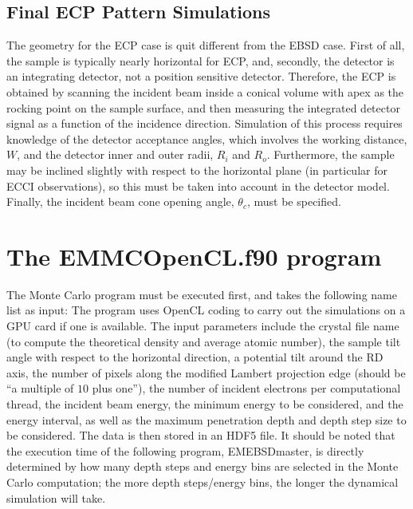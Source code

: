 \documentclass[DIV=calc, paper=letter, fontsize=11pt]{scrartcl}	 %
\begin{document}
\subsection{Final ECP Pattern Simulations \label{sec:ECP}}
The geometry for the ECP case is quit different from the EBSD case.  First of all, the sample is typically nearly horizontal for ECP,
and, secondly, the detector is an integrating detector, not a position sensitive detector.  Therefore, the ECP is obtained by scanning
the incident beam inside a conical volume with apex as the rocking point on the sample surface, and then measuring the integrated 
detector signal as a function of the incidence direction.  Simulation of this process requires knowledge of the detector acceptance 
angles, which involves the working distance, $W$, and the detector inner and outer radii, $R_i$ and $R_o$.  Furthermore, the sample may be inclined
slightly with respect to the horizontal plane (in particular for ECCI observations), so this must be taken into account in the detector model.
Finally, the incident beam cone opening angle, $\theta_c$, must be specified.  %






\section{The \protect\textsf{EMMCOpenCL.f90} program\label{sec:f90MC}}
The Monte Carlo program must be executed first, and takes the following name list as input:
The program uses OpenCL coding to carry out the simulations on a GPU card if one is available.  The input parameters
include the crystal file name (to compute the theoretical density and average atomic number), the sample
tilt angle with respect to the horizontal direction, a potential tilt around the \textsf{RD} axis, the number of pixels
along the modified Lambert projection edge (should be ``a multiple of $10$ plus one''), the number of incident electrons per computational thread, 
the incident beam energy, the minimum energy to be considered, and the energy interval,
as well as the maximum penetration depth and depth step size to be considered.  The data is then stored in an 
HDF5 file.  It should be noted that the execution time of the 
following program, \textsf{EMEBSDmaster}, is directly determined by how many depth steps and energy bins are selected in the
Monte Carlo computation; the more depth steps/energy bins, the longer the dynamical simulation will take.
\end{document}
